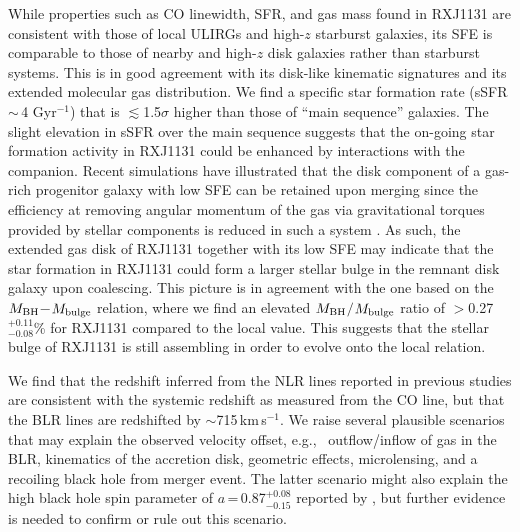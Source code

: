 \documentclass[]{emulateapj}
\newcommand{\kms}{\mbox{km\,s$^{-1}$}\xspace}
\newcommand{\pmOne}{\mbox{$^{-1}$}\xspace}
\newcommand{\petm}[2]{$^{+#1}_{-#2}$}
\newcommand{\eq}{\,=\,}
\newcommand{\ssim}{\,$\sim$\,}
\newcommand{\eg}{{e.g.,~}}
\newcommand{\SF}{star formation\xspace}
\newcommand{\SB}{starburst\xspace}
\begin{document}
While properties such as CO linewidth, SFR, and gas mass found in RXJ1131
are consistent with those of local ULIRGs and high-$z$ starburst galaxies,
its SFE is comparable to those of nearby and high-$z$ disk galaxies rather than
\SB systems. This is in good agreement with its disk-like kinematic signatures and its extended molecular gas distribution.
We find a specific \SF rate (sSFR\ssim4 Gyr\pmOne) that is $\lesssim$1.5$\sigma$ higher than those of ``main sequence'' galaxies.
The slight elevation in sSFR over the main sequence suggests that
the on-going star formation activity in RXJ1131 could be enhanced by interactions with the companion.
Recent simulations have illustrated that the disk component of a gas-rich
progenitor galaxy with low SFE can be
retained upon merging since the efficiency at removing angular momentum of the gas via
gravitational torques provided by stellar components is reduced in such a system \citep{Springel05a, Robertson06a, Hopkins09a}.
As such, the extended gas disk of RXJ1131 together with its low SFE may indicate
that the \SF in RXJ1131 could form a
larger stellar bulge in the remnant disk galaxy upon coalescing.
This picture is in agreement with the one based on the \mbox{$M_{\rm BH}$$-$$M_{\rm bulge}$} relation,
where we find an elevated \mbox{$M_{\rm BH}$$/$$M_{\rm bulge}$} ratio of $>$0.27\petm{0.11}{0.08}\% for
RXJ1131 compared to the local value.
This suggests that the stellar bulge of RXJ1131 is still assembling in order to evolve onto the local relation.

We find that the redshift inferred from the NLR lines reported in previous studies are consistent with the  systemic redshift as measured
from the CO line,
but that the BLR lines are redshifted by $\sim$715\,\kms.
We raise several plausible scenarios that may explain the observed velocity offset, \eg
outflow/inflow of gas in the BLR, kinematics of the accretion disk, geometric effects,
microlensing, and a recoiling black hole from merger event.
The latter scenario might also explain the high black hole spin parameter of
$a$\eq0.87\petm{0.08}{0.15} reported by \citet[][]{Reis14a}, but
further evidence is needed to confirm or rule out this scenario.
\end{document}
